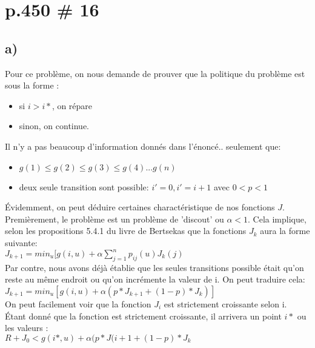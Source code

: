 \documentclass[oneside]{book}
\begin{document}
\section{p.450 \# 16}
\subsection*{a)}
Pour ce problème, on nous demande de prouver que la politique du problème est sous la forme :\\

\begin{itemize}
\item si $i > i*$, on répare\\
\item sinon, on continue.
\end{itemize}

Il n'y a pas beaucoup d'information donnés dans l'énoncé.. seulement que:\\
\begin{itemize}
\item $g(1) \leq g(2) \leq g(3) \leq g(4) ... g(n)$
\item deux seule transition sont possible: $i'= 0, i'= i+1$ avec $0 < p < 1$
\end{itemize}

Évidemment, on peut déduire certaines charactéristique de nos fonctions $J$. Premièrement, le problème est un problème de 'discout' ou $\alpha < 1$. Cela implique, selon les propositions 5.4.1 du livre de Bertsekas que la fonctions $J_k$ aura la forme suivante:\\

$J_{k+1} = min_u[g(i,u) + \alpha \sum\limits_{j=1}^{n}p_{ij}(u)J_k(j)$\\

Par contre, nous avons déjà établie que les seules transitions possible était qu'on reste au même endroit ou qu'on incrémente la valeur de i. On peut traduire cela:\\

$J_{k+1} = min_u[g(i,u) + \alpha (p*J_{k+1} + (1-p)*J_k)]$\\

On peut facilement voir que la fonction $J_i$ est strictement croissante selon i. Étant donné que la fonction est strictement croissante, il arrivera un point $i*$ ou les valeurs :\\

$R + J_0 < g(i*,u) + \alpha (p*J({i+1} + (1-p)*J_{k}$\\
\end{document}
